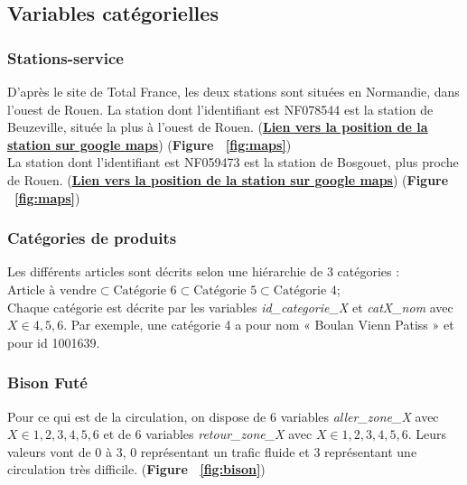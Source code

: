 \documentclass{article} %
\begin{document}
\subsection{Variables catégorielles}
\subsubsection{Stations-service}
D’après le site de Total France, les deux stations sont situées en Normandie, dans l’ouest de Rouen. La station dont l’identifiant est NF078544 est la station de Beuzeville, située la plus à l’ouest de Rouen.
 (\underline{\textbf{\textcolor[rgb]{0,0,1}{\href{https://www.google.fr/maps/place/Total/@49.3093522,0.3356408,11.92z/data=!4m5!3m4!1s0x47e1caf7b2d7546d:0xa7a5f053e610517e!8m2!3d49.3248478!4d0.328814}{Lien vers la position de la station sur google maps}}}})  (\textbf{Figure ~\ref{fig:maps}})\\

La station dont l’identifiant est NF059473 est la station de Bosgouet, plus proche de Rouen.
 (\href{https://www.google.fr/maps/search/13+-+AIRE+DE+BOSGOUET+SUD+27310+BOURG+ACHARd/@49.3711274,0.7536505,10.69z}{\underline{\textbf{\textcolor[rgb]{0,0,1}{Lien vers la position de la station sur google maps}}}})  (\textbf{Figure ~\ref{fig:maps}}) \\

 
\subsubsection{Catégories de produits}
Les différents articles sont décrits selon une hiérarchie de 3 catégories : $\mbox{Article à vendre} \subset \mbox{Catégorie 6} \subset \mbox{Catégorie 5} \subset \mbox{Catégorie 4}$;\\
Chaque catégorie est décrite par les variables \textit{id\_categorie\_X} et \textit{catX\_nom} avec $X \in {4,5,6}$. Par exemple, une catégorie 4 a pour nom « Boulan Vienn Patiss » et pour id 1001639.

\subsubsection{Bison Futé}
Pour ce qui est de la circulation, on dispose de 6 variables \textit{aller\_zone\_X} avec $X \in {1,2,3,4,5,6}$ et de 6 variables \textit{retour\_zone\_X} avec $X \in {1,2,3,4,5,6}$. Leurs valeurs vont de 0 à 3, 0 représentant un trafic fluide et 3 représentant une circulation très difficile. (\textbf{Figure ~\ref{fig:bison}})
\end{document}
